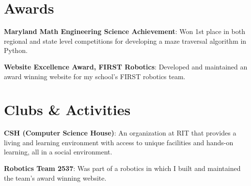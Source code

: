 \documentclass[a4paper,margin,line]{resume}
\begin{document}
\begin{resume}
\section{\mysidestyle Awards}
    \begin{asparablank}
        \item \textbf{Maryland Math Engineering Science Achievement}: Won 1st place
            in both regional and state level competitions for developing a maze
            traversal algorithm in Python.
        \item \textbf{Website Excellence Award, FIRST Robotics}: Developed and maintained an
            award winning website for my school's FIRST robotics team.
    \end{asparablank}
\section{\mysidestyle Clubs \& Activities}
    \begin{asparablank}
        \item \textbf{CSH (Computer Science House)}: An organization at RIT that 
            provides a living and learning environment with access to unique facilities
            and hands-on learning, all in a social environment.
        \item \textbf{Robotics Team 2537}: Was part of a robotics in which I built and
            maintained the team's award winning website.
    \end{asparablank}
\end{resume}
\end{document}
